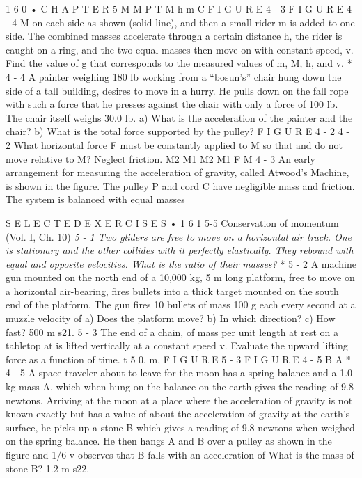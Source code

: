 \documentclass[10pt,oneside]{article}
\begin{document}
1 6 0 • C H A P T E R  5 M M P T M h m C F I G U R E  4 - 3 F I G U R E  4 - 4 M on each side as shown (solid line), and then a small rider m is added to one side. The combined masses accelerate through a certain distance h, the rider is caught on a ring, and the two equal masses then move on with constant speed, v. Find the value of g that corresponds to the measured values of m, M, h, and v. \emph{ } * 4 - 4 A painter weighing 180 lb working from a “bosun’s” chair hung down the side of a tall building, desires to move in a hurry. He pulls down on the fall rope with such a force that he presses against the chair with only a force of 100 lb. The chair itself weighs 30.0 lb. a) What is the acceleration of the painter and the chair? b) What is the total force supported by the pulley? F I G U R E  4 - 2 \emph{ } 4 - 2 What horizontal force F must be constantly applied to M so that and do not move relative to M? Neglect friction. M2 M1 M2 M1 F M \emph{ } 4 - 3 An early arrangement for measuring the acceleration of gravity, called Atwood’s Machine, is shown in the figure. The pulley P and cord C have negligible mass and friction. The system is balanced with equal masses\par

S E L E C T E D  E X E R C I S E S • 1 6 1 5-5 Conservation of momentum (Vol. I, Ch. 10) \emph{ 5 - 1 Two gliders are free to move on a horizontal air track. One is stationary and the other collides with it perfectly elastically. They rebound with equal and opposite velocities. What is the ratio of their masses? } * 5 - 2 A machine gun mounted on the north end of a 10,000 kg, 5 m long platform, free to move on a horizontal air-bearing, fires bullets into a thick target mounted on the south end of the platform. The gun fires 10 bullets of mass 100 g each every second at a muzzle velocity of a) Does the platform move? b) In which direction? c) How fast? 500 m s21. \emph{ } 5 - 3 The end of a chain, of mass per unit length at rest on a tabletop at is lifted vertically at a constant speed v. Evaluate the upward lifting force as a function of time. t 5 0, m, F I G U R E  5 - 3 F I G U R E  4 - 5 B A \emph{ } * 4 - 5 A space traveler about to leave for the moon has a spring balance and a 1.0 kg mass A, which when hung on the balance on the earth gives the reading of 9.8 newtons. Arriving at the moon at a place where the acceleration of gravity is not known exactly but has a value of about the acceleration of gravity at the earth’s surface, he picks up a stone B which gives a reading of 9.8 newtons when weighed on the spring balance. He then hangs A and B over a pulley as shown in the figure and 1/6 v observes that B falls with an acceleration of What is the mass of stone B? 1.2 m s22.\par
\end{document}
